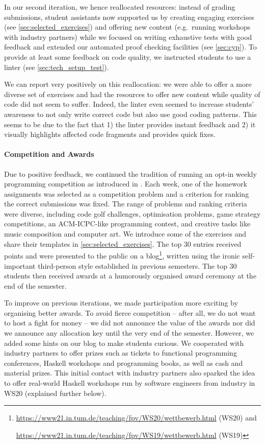 In our second iteration, we hence reallocated resources:
instead of grading submissions,
student assistants now supported us by creating engaging exercises
(see \cref{sec:selected_exercises})
and offering new content (e.g.\ running workshops with industry partners)
while we focused on writing exhaustive tests with good feedback and extended our automated proof checking facilities (see \cref{sec:cyp}).
To provide at least some feedback on
code quality, we instructed students
to use a linter (see \cref{sec:tech_setup_test}).

We can report very positively on this reallocation:
we were able to offer a more diverse set of exercises and
had the resources to offer new content
while quality of code did not seem to suffer.
Indeed, the linter even seemed to increase students' awareness
to not only write correct code but also use good coding patterns.
This seems to be due to the fact that 1) the linter provides instant feedback and 2) it visually highlights affected code fragments and provides quick fixes.

\paragraph{Competition and Awards}
Due to positive feedback,
we continued the tradition of running an opt-in weekly
programming competition as introduced in \cite{next_1100}.
Each week, one of the homework assignments
was selected as a competition problem
and a criterion for ranking the correct submissions was fixed.
The range of problems and ranking criteria were diverse,
including code golf challenges,
optimisation problems,
game strategy competitions,
an ACM-ICPC-like programming contest,
and creative tasks like music composition
and computer art.
We introduce some of the exercises and share their templates in \cref{sec:selected_exercises}.
The top 30 entries received points
and were presented to the public on a blog\footnote{\url{https://www21.in.tum.de/teaching/fpv/WS20/wettbewerb.html} (WS20) and

\url{https://www21.in.tum.de/teaching/fpv/WS19/wettbewerb.html} (WS19)},
written using the ironic self-important third-person style established in previous semesters.
The top 30 students then received awards at
a humorously organised award ceremony at the end of the semester.

To improve on previous iterations,
we made participation more exciting by organising better awards.
To avoid fierce competition -- after all, we do not want to host a fight for money --
we did not announce the value of the awards nor did we announce any allocation key
until the very end of the semester.
However, we added some hints on our blog to make students curious.
We cooperated with industry partners
to offer prizes such as tickets to functional programming conferences,
Haskell workshops and programming books, as well as cash and material prizes.
This initial contact with industry partners
also sparked the idea to offer real-world Haskell workshops
run by software engineers from industry in WS20 (explained further below).

